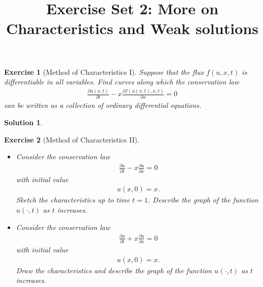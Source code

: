 \documentclass[10pt,letterpaper]{article}
\theoremstyle{break}
\newtheorem{exercise}{Exercise}
\newtheorem{mysolution}{Solution}
\newenvironment{solution}{\begin{mysolution}}{\end{mysolution}}
\begin{document}
\title{Exercise Set 2: More on Characteristics and Weak solutions}
\date{}
\author{}

\maketitle



















\begin{exercise}[Method of Characteristics I]

	Suppose that the flux $f(u,x,t)$ is differentiable in all variables.
	Find curves along which the conservation law 
	\begin{align}
		\frac{\partial u(x,t)}{\partial t}
		-
		x
		\frac{\partial f(u(x,t),x,t)}{\partial x}
		= 0
	\end{align}
	can be written as a collection of ordinary differential equations.
\end{exercise}

\begin{solution}
	
\end{solution}
	











\begin{exercise}[Method of Characteristics II]
	${}$%
	\begin{itemize}
	\item[(i)] Consider the conservation law 
	\begin{align}
		\frac{\partial u}{\partial t}
		-
		x
		\frac{\partial u}{\partial x}
		= 0
	\end{align}
	with initial value
	\begin{align}
		u(x,0)=x.
	\end{align}
	Sketch the characteristics up to time $t=1$. Describe the graph of the function $u(\cdot,t)$
	as $t$ increases.
	\item[(ii)] Consider the conservation law
	\begin{align}
		\frac{\partial u}{\partial t}
		+
		x
		\frac{\partial u}{\partial x}
		= 0
	\end{align}
	with initial value
	\begin{align}
		u(x,0)=x.
	\end{align}
	Draw the characteristics and describe the graph of the function $u(\cdot,t)$ as $t$ increases.
	\end{itemize}
\end{exercise}
\end{document}
